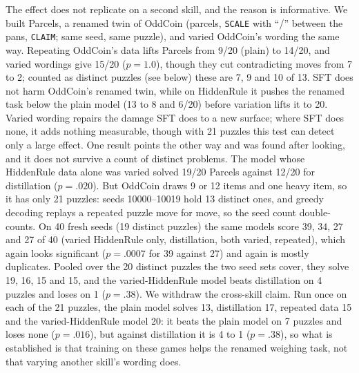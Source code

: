 \documentclass[11pt]{article}
\begin{document}
The effect does not replicate on a second skill, and the reason is informative. We built Parcels, a renamed twin of
OddCoin (parcels, \texttt{SCALE} with ``/'' between the pans, \texttt{CLAIM}; same seed, same puzzle), and varied
OddCoin's wording the same way. Repeating OddCoin's data lifts Parcels from 9/20 (plain) to 14/20, and varied
wordings give 15/20 ($p=1.0$), though they cut contradicting moves from 7 to 2; counted as distinct puzzles (see
below) these are 7, 9 and 10 of 13. SFT does not harm OddCoin's renamed twin, while on HiddenRule it pushes the
renamed task below the plain model (13 to 8 and 6/20) before variation lifts it to 20. Varied wording repairs the
damage SFT does to a new surface; where SFT does none, it adds nothing measurable, though with 21 puzzles this test
can detect only a large effect. One result points the other way and was found after
looking, and it does not survive a count of distinct problems. The model whose HiddenRule data alone was varied
solved 19/20 Parcels against 12/20 for distillation ($p=.020$). But OddCoin draws 9 or 12 items and one heavy item,
so it has only 21 puzzles: seeds 10000--10019 hold 13 distinct ones, and greedy decoding replays a repeated puzzle
move for move, so the seed count double-counts. On 40 fresh seeds (19 distinct puzzles) the same models score 39,
34, 27 and 27 of 40 (varied HiddenRule only, distillation, both varied, repeated), which again looks significant
($p=.0007$ for 39 against 27) and again is mostly duplicates. Pooled over the 20 distinct puzzles the two seed sets
cover, they solve 19, 16, 15 and 15, and the varied-HiddenRule model beats distillation on 4 puzzles and loses on 1
($p=.38$). We withdraw the cross-skill claim. Run once on each of the 21 puzzles, the plain model solves 13,
distillation 17, repeated data 15 and the varied-HiddenRule model 20: it beats the plain model on 7 puzzles and
loses none ($p=.016$), but against distillation it is 4 to 1 ($p=.38$), so what is established is that training on
these games helps the renamed weighing task, not that varying another skill's wording does.
\end{document}
